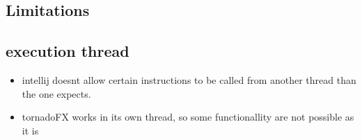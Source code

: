 	\subsection{Limitations}


		\subsection{execution thread}
		\begin{itemize}
			\item intellij doesnt allow certain instructions to be called from another thread than the one expects.
			\item tornadoFX works in its own thread, so some functionallity are not possible as it is
		\end{itemize}